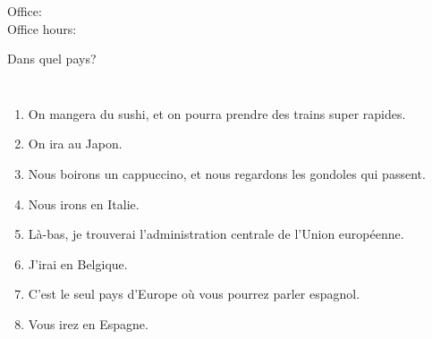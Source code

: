 \documentclass{beamer}
\subtitle[Pays et prépositions]{Les pays et les prépositions}
\begin{document}
  \begin{frame}
    \titlepage
    \tiny{Office: \\
          Office hours: }
  \end{frame}

  \begin{frame}{Dans quel pays?}
    \footnotesize
    \begin{columns}
        \begin{enumerate}
          \item On mangera du sushi, et on pourra prendre des trains super rapides.
          \item<2->[$\to$] On ira au Japon.
          \item<3-> Nous boirons un cappuccino, et nous regardons les gondoles qui passent.
          \item<4->[$\to$] Nous irons en Italie.
          \item<5-> Là-bas, je trouverai l'administration centrale de l'Union européenne.
          \item<6->[$\to$] J'irai en Belgique.
          \item<7-> C'est le seul pays d'Europe où vous pourrez parler espagnol.
          \item<8->[$\to$] Vous irez en Espagne.
        \end{enumerate}
        \begin{minipage}[c][0.8\textheight]{\linewidth}
          \begin{center}
          \end{center}
        \end{minipage}
    \end{columns}
  \end{frame}
\end{document}

